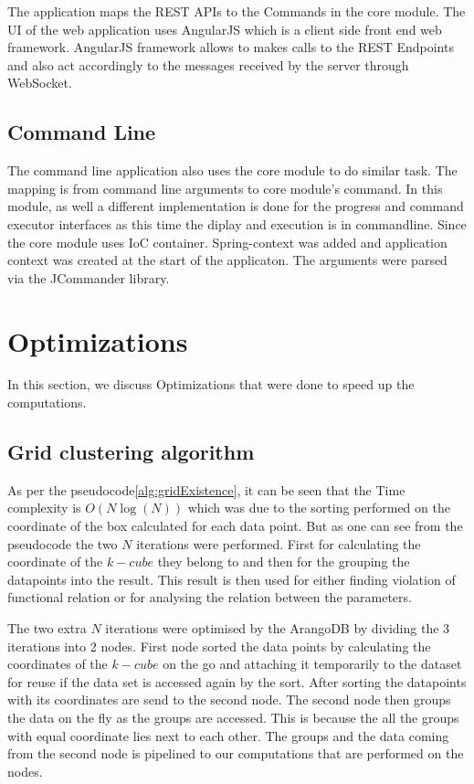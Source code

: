 The application maps the REST APIs to the Commands in the core module. The UI of the web application uses AngularJS which is a client side front end web framework. AngularJS framework allows to makes calls to the REST Endpoints and also act accordingly to the messages received by the server through WebSocket.

\subsection{Command Line}

The command line application also uses the core module to do similar task. The mapping is from command line arguments to core module's command. In this module, as well a different implementation is done for the progress and command executor interfaces as this time the diplay and execution is in commandline. Since the core module uses IoC container. Spring-context was added and application context was created at the start of the applicaton. The arguments were parsed via the JCommander library. 

\section{Optimizations}

In this section, we discuss Optimizations that were done to speed up the computations.

\subsection{Grid clustering algorithm}

As per the pseudocode\ref{alg:gridExistence}, it can be seen that the Time complexity is \(O(N\log(N))\) which was due to the sorting performed on the coordinate of the box calculated for each data point. But as one can see from the pseudocode the two \(N\) iterations were performed. First for calculating the coordinate of the \(k-cube\) they belong to and then for the grouping the datapoints into the result. This result is then used for either finding violation of functional relation or for analysing the relation between the parameters. 

The two extra \(N\) iterations were optimised by the ArangoDB by dividing the 3 iterations into 2 nodes. First node sorted the data points by calculating the coordinates of the \(k-cube\) on the go and attaching it temporarily to the dataset for reuse if the data set is accessed again by the sort. After sorting the datapoints with its coordinates are send to the second node. The second node then groups the data on the fly as the groups are accessed. This is because the all the groups with equal coordinate lies next to each other. The groups and the data coming from the second node is pipelined to our computations that are performed on the nodes. 

